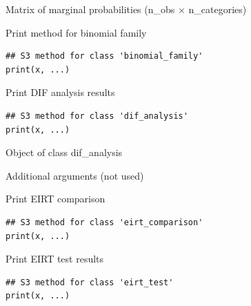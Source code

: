 \documentclass[a4paper]{book}
\begin{document}
%
\begin{Value}
Matrix of marginal probabilities (n\_obs × n\_categories)
\end{Value}
%
\begin{Description}
Print method for binomial family
\end{Description}
%
\begin{Usage}
\begin{verbatim}
## S3 method for class 'binomial_family'
print(x, ...)
\end{verbatim}
\end{Usage}
%
\begin{Description}
Print DIF analysis results
\end{Description}
%
\begin{Usage}
\begin{verbatim}
## S3 method for class 'dif_analysis'
print(x, ...)
\end{verbatim}
\end{Usage}
%
\begin{Arguments}
\begin{ldescription}
\item[\code{x}] Object of class dif\_analysis

\item[\code{...}] Additional arguments (not used)
\end{ldescription}
\end{Arguments}
%
\begin{Description}
Print EIRT comparison
\end{Description}
%
\begin{Usage}
\begin{verbatim}
## S3 method for class 'eirt_comparison'
print(x, ...)
\end{verbatim}
\end{Usage}
%
\begin{Description}
Print EIRT test results
\end{Description}
%
\begin{Usage}
\begin{verbatim}
## S3 method for class 'eirt_test'
print(x, ...)
\end{verbatim}
\end{Usage}
\end{document}
